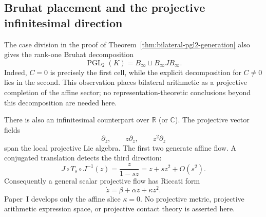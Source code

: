 \subsection{Bruhat placement and the projective infinitesimal direction}

The case division in the proof of
Theorem~\ref{thm:bilateral-pgl2-generation} also gives the rank-one Bruhat
decomposition
\[
  \operatorname{PGL}_2(K)=B_\infty\sqcup B_\infty J B_\infty.
\]
Indeed, $C=0$ is precisely the first cell, while the explicit decomposition
for $C\ne0$ lies in the second.  This observation places bilateral arithmetic
as a projective completion of the affine sector; no representation-theoretic
conclusions beyond this decomposition are needed here.

There is also an infinitesimal counterpart over $\mathbb R$ (or $\mathbb C$).
The projective vector fields
\[
  \partial_z,
  \qquad z\partial_z,
  \qquad z^2\partial_z
\]
span the local projective Lie algebra.  The first two generate affine flow.  A
conjugated translation detects the third direction:
\[
  J\circ T_s\circ J^{-1}(z)
  =\frac{z}{1-sz}
  =z+sz^2+O(s^2).
\]
Consequently a general scalar projective flow has Riccati form
\[
  \dot z=\beta+\alpha z+\kappa z^2.
\]
Paper~I develops only the affine slice $\kappa=0$.  No projective metric,
projective arithmetic expression space, or projective contact theory is
asserted here.
